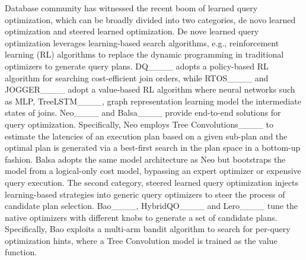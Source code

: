  Database community has witnessed the recent boom of learned query optimization, which can be broadly divided into two categories, de novo learned optimization and steered learned optimization.
De nove learned query optimization leverages learning-based search algorithms, e.g., reinforcement learning (RL) algorithms to replace the dynamic programming in traditional optimizers to generate query plans.
DQ____ adopts a policy-based RL algorithm for searching cost-efficient join orders, while RTOS____ and JOGGER____ adopt a value-based RL algorithm where neural networks such as MLP, TreeLSTM____, graph representation learning model the intermediate states of joins. 
Neo____ and Balsa____ provide end-to-end solutions for query optimization.
Specifically, 
Neo employs Tree Convolutions____ to estimate the latencies of an execution plan based on a given sub-plan and the optimal plan is generated via a best-first search in the plan space in a bottom-up fashion.
Balsa adopts the same model architecture as Neo but bootstraps the model from a logical-only cost model, bypassing an expert optimizer or expensive query execution.
The second category, steered learned query optimization injects learning-based strategies into generic query optimizers to steer the process of candidate plan selection.
Bao____, HybridQO____ and Lero____ tune the native  optimizers with different knobs to generate a set of candidate plans. 
Specifically, Bao exploits a multi-arm bandit algorithm to search for per-query optimization hints, where a Tree Convolution model is trained as the value function. 
